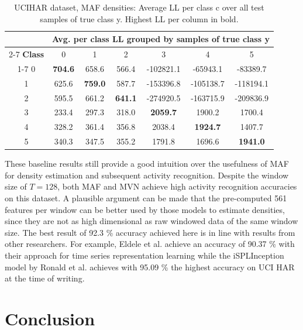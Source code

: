 \documentclass[11pt,titlepage,oneside,openany]{book}
\begin{document}
\begin{table}[H]
	\centering
	\tiny
	\begin{tabular}{c c c c c c c}
		\toprule
		\multirow[b]{2}{*}{} &
		\multicolumn{6}{c}{\bfseries Avg. per class LL grouped by samples of true class y}\\
		\cmidrule(lr){2-7}
		\bfseries Class & 0 & 1 & 2 & 3 & 4 & 5\\
		\cmidrule(lr){1-7}
		0 & \textbf{704.6} & 658.6 & 566.4 & -102821.1 & -65943.1 & -83389.7 \\
		1 & 625.6 & \textbf{759.0} & 587.7 & -153396.8 & -105138.7 & -118194.1 \\
		2 & 595.5 & 661.2 & \textbf{641.1} & -274920.5 & -163715.9 & -209836.9 \\
		3 & 233.4 & 297.3 & 318.0 & \textbf{2059.7} & 1900.2 & 1700.4 \\
		4 & 328.2 & 361.4 & 356.8 & 2038.4 & \textbf{1924.7} & 1407.7 \\
		5 & 340.3 & 347.5 & 355.2 & 1791.8 & 1696.6 & \textbf{1941.0} \\
		\bottomrule
	\end{tabular}
	\caption[UCI HAR average LL]{\label{tab:llu} UCIHAR dataset, MAF densities: Average LL per class c over all test samples of true class y. Highest LL per column in bold.}
\end{table}

These baseline results still provide a good intuition over the usefulness of MAF for density estimation and subsequent activity recognition. Despite the window size of $T=128$, both MAF and MVN achieve high activity recognition accuracies on this dataset. A plausible argument can be made that the pre-computed 561 features per window can be better used by those models to estimate densities, since they are not as high dimensional as raw windowed data of the same window size. The best result of 92.3 \% accuracy achieved here is in line with results from other researchers. For example, Eldele et al. \cite{eldele_time-series_2021} achieve an accuracy of 90.37 \% with their approach for time series representation learning while the iSPLInception model by Ronald et al. \cite{ronald_isplinception_2021} achieves with 95.09 \% the highest accuracy on UCI HAR at the time of writing.

\chapter{Conclusion}
\label{cha:conclusion}
\end{document}
